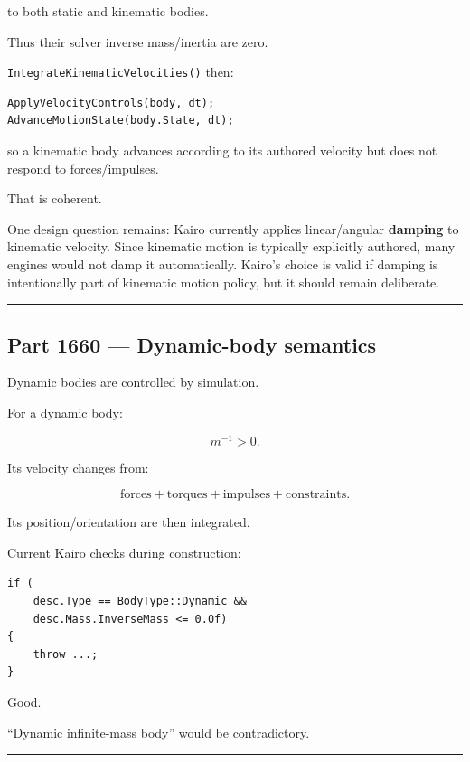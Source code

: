 to both static and kinematic bodies.

Thus their solver inverse mass/inertia are zero.

\texttt{IntegrateKinematicVelocities()} then:

\begin{verbatim}
ApplyVelocityControls(body, dt);
AdvanceMotionState(body.State, dt);
\end{verbatim}

so a kinematic body advances according to its authored velocity but does not respond to forces/impulses.

That is coherent.

One design question remains: Kairo currently applies linear/angular \textbf{damping} to kinematic velocity. Since kinematic motion is typically explicitly authored, many engines would not damp it automatically. Kairo's choice is valid if damping is intentionally part of kinematic motion policy, but it should remain deliberate.

\begin{center}\rule{0.5\linewidth}{0.5pt}\end{center}

\subsection{Part 1660 --- Dynamic-body semantics}\label{06-engine-ii-ch037-part-1660-dynamic-body-semantics}

Dynamic bodies are controlled by simulation.

For a dynamic body:

\[
m^{-1}>0.
\]

Its velocity changes from:

\[
\text{forces}
+
\text{torques}
+
\text{impulses}
+
\text{constraints}.
\]

Its position/orientation are then integrated.

Current Kairo checks during construction:

\begin{verbatim}
if (
    desc.Type == BodyType::Dynamic &&
    desc.Mass.InverseMass <= 0.0f)
{
    throw ...;
}
\end{verbatim}

Good.

``Dynamic infinite-mass body'' would be contradictory.

\begin{center}\rule{0.5\linewidth}{0.5pt}\end{center}

